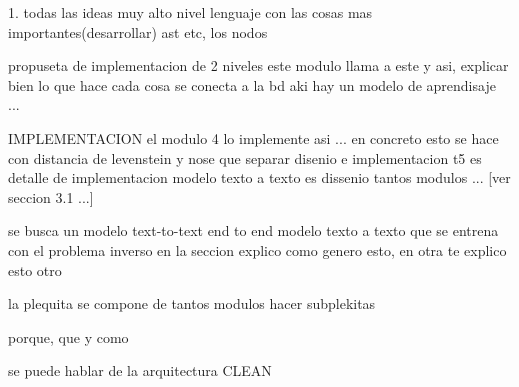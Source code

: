 
1.
todas las ideas
muy alto nivel
lenguaje con las cosas mas importantes(desarrollar)
ast etc, los nodos

propuseta de implementacion de 2 niveles
este modulo llama a este y asi, explicar bien lo que hace cada cosa
se conecta a la bd
aki hay un modelo de aprendisaje ...

IMPLEMENTACION
el modulo 4 lo implemente asi ...
en concreto esto se hace con distancia de levenstein y nose que
separar disenio e implementacion
t5 es detalle de implementacion
modelo texto a texto es dissenio
tantos modulos ...
[ver seccion 3.1 ...]

se busca un modelo text-to-text end to end
modelo texto a texto que se entrena con el problema inverso
en la seccion explico como genero esto, en otra te explico esto otro

la plequita se compone de tantos modulos
hacer subplekitas

porque, que y como

se puede hablar de la arquitectura CLEAN

